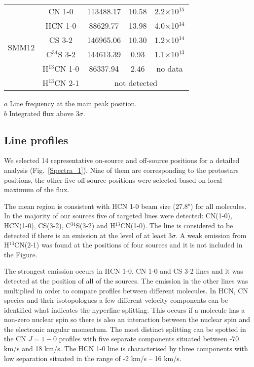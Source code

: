 \documentclass{aa}
\begin{document}
\begin{table}
\begin{tabular}{c c c c c}
\multirow{6}{*}{SMM12} & CN 1-0 & 113488.17 & 10.58 & 2.2$\times$10$^{15}$\\
{} & HCN 1-0 & 88629.77 & 13.98 & 4.0$\times$10$^{14}$\\ 
{} & CS 3-2 & 146965.06 & 10.30 & 1.2$\times$10$^{14}$\\  
{} & C$^{34}$S 3-2 & 144613.39 & 0.93 & 1.1$\times$10$^{13}$\\ 
{} & H$^{13}$CN 1-0 & 86337.94 & 2.46 & no data\\ 
{} & H$^{13}$CN 2-1 & \multicolumn{3}{c}{not detected}  \\  \hline
\end{tabular}
\begin{flushleft}
$a$ Line frequency at the main peak position. \\
$b$ Integrated flux above 3$\sigma$.\\
\end{flushleft}
\end{table}

\subsection{Line profiles}

We selected 14 representative on-source and off-source positions for a detailed analysis (Fig.~\ref{Spectra_1}). Nine of them are corresponding to the protostars positions, the other five off-source positions were selected based on local maximum of the flux.   

The mean region is consistent with HCN 1-0 beam size (27.8") for all molecules. In the majority of our sources five of targeted lines were detected: CN(1-0), HCN(1-0), CS(3-2), C$^{34}$S(3-2) and H$^{13}$CN(1-0). The line is considered to be detected if there is an emission at the level of at least 3$\sigma$. A weak emission from H$^{13}$CN(2-1) was found at the positions of four sources and it is not included in the Figure. 

The strongest emission occurs in HCN 1-0, CN 1-0 and CS 3-2 lines and it was detected at the position of all of the sources. The emission in the other lines was multiplied in order to compare profiles between different molecules. In HCN, CN species and their isotopologues a few different velocity components can be identified what indicates the hyperfine splitting. This occurs if a molecule has a non-zero nuclear spin so there is also an interaction between the nuclear spin and the electronic angular momentum. The most distinct splitting can be spotted in the CN $J = 1-0$ profiles with five separate components situated between -70 km/s and 18 km/s. The HCN 1-0 line is characterised by three components with low separation situated in the range of -2 km/s – 16 km/s. 
\end{document}
